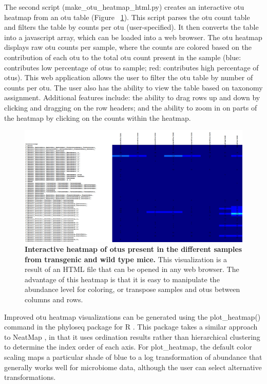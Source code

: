 The second script (make\_otu\_heatmap\_html.py) creates an interactive \gls{otu} heatmap
from an \gls{otu} table (Figure ~\ref{bfigure15}). This script parses the \gls{otu} count table
and filters the table by counts per \gls{otu} (user-specified). It then converts the table
into a javascript array, which can be loaded into a web browser. The \gls{otu} heatmap
displays raw \gls{otu} counts per sample, where the counts are colored based on the
contribution of each \gls{otu} to the total \gls{otu} count present in the sample (blue:
contributes low percentage of \gls{otu}s to sample; red: contributes high percentage of
\gls{otu}s). This web application allows the user to filter the \gls{otu} table by number of
counts per \gls{otu}. The user also has the ability to view the table based on taxonomy
assignment. Additional features include: the ability to drag rows up and down by
clicking and dragging on the row headers; and the ability to zoom in on parts of
the heatmap by clicking on the counts within the heatmap.

\begin{figure}[htbp]
\includegraphics[width=0.75\columnwidth]{chapter_book_figures/Figure_15.jpg}
\caption[Interactive heatmap of \gls{otu}s present in the different samples from transgenic and wild type mice]{\textbf{Interactive heatmap of \gls{otu}s present in the different samples from transgenic and wild type mice.}
This visualization is a result of an HTML file that can be opened in any web browser.
The advantage of this heatmap is that it is easy to manipulate the abundance level for
coloring, or transpose samples and \gls{otu}s between columns and rows.}
\label{bfigure15}
\end{figure}

Improved \gls{otu} heatmap visualizations can be generated using the plot\_heatmap() command
in the phyloseq package for R \cite{McMurdie2013}. This package takes a similar approach
to NeatMap \cite{Rajaram2010}, in that it uses ordination results rather than hierarchical
clustering to determine the index order of each axis. For plot\_heatmap, the default color
scaling maps a particular shade of blue to a log transformation of abundance that generally
works well for microbiome data, although the user can select alternative transformations.

